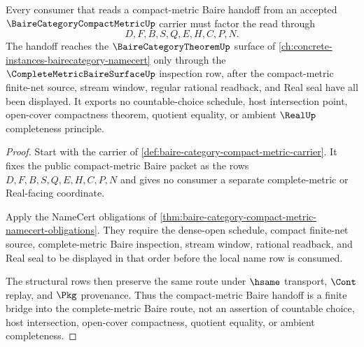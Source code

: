 \begin{theorem}
\label{thm:baire-category-compact-metric-route}
Every consumer that reads a compact-metric Baire handoff from an accepted $\BaireCategoryCompactMetricUp$ carrier must factor the read through
$$
D,F,B,S,Q,E,H,C,P,N .
$$
The handoff reaches the $\BaireCategoryTheoremUp$ surface of \autoref{ch:concrete-instances-bairecategory-namecert} only through the $\CompleteMetricBaireSurfaceUp$ inspection row, after the compact-metric finite-net source, stream window, regular rational readback, and Real seal have all been displayed. It exports no countable-choice schedule, host intersection point, open-cover compactness theorem, quotient equality, or ambient $\RealUp$ completeness principle.
\end{theorem}
\begin{proof}
Start with the carrier of \autoref{def:baire-category-compact-metric-carrier}. It fixes the public compact-metric Baire packet as the rows $D,F,B,S,Q,E,H,C,P,N$ and gives no consumer a separate complete-metric or Real-facing coordinate.

Apply the NameCert obligations of \autoref{thm:baire-category-compact-metric-namecert-obligations}. They require the dense-open schedule, compact finite-net source, complete-metric Baire inspection, stream window, rational readback, and Real seal to be displayed in that order before the local name row is consumed.

The structural rows then preserve the same route under $\hsame$ transport, $\Cont$ replay, and $\Pkg$ provenance. Thus the compact-metric Baire handoff is a finite bridge into the complete-metric Baire route, not an assertion of countable choice, host intersection, open-cover compactness, quotient equality, or ambient completeness.
\end{proof}


